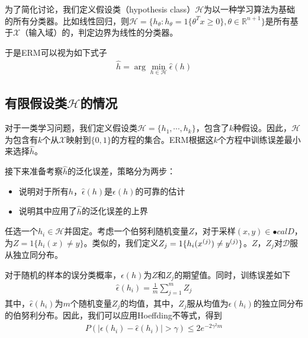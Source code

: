 为了简化讨论，我们定义假设类（hypothesis class）$\mathcal{H}$为以一种学习算法为基础的所有分类器。比如线性回归，则$\mathcal{H}=\{h_\theta:h_\theta=1\{\theta^Tx\geq 0\},\theta\in \mathbb{R}^{n+1}\}$是所有基于$\mathcal{X}$（输入域）的，判定边界为线性的分类器。

于是ERM可以视为如下式子
\begin{eqnarray}
\hat{h}=\arg\min_{h\in\mathcal{H}}\hat{\epsilon}(h)
\end{eqnarray}

\subsection{有限假设类$\mathcal{H}$的情况}
对于一类学习问题，我们定义假设类$\mathcal{H}=\{h_1,\cdots,h_k\}$，包含了$k$种假设。因此，$\mathcal{H}$为包含有$k$个从$\mathcal{X}$映射到$\{0,1\}$的方程的集合。ERM根据这$k$个方程中训练误差最小来选择$\hat{h}$。

接下来准备考察$\hat{h}$的泛化误差，策略分为两步：
\begin{itemize}
\item 说明对于所有$h$，$\hat{\epsilon}(h)$是$\epsilon(h)$的可靠的估计
\item 说明其中应用了$\hat{h}$的泛化误差的上界
\end{itemize}

任选一个$h_i\in \mathcal{H}$并固定。考虑一个伯努利随机变量$Z$，对于采样$(x,y)\in \mathcal{•}cal{D}$，为$Z=1\{h_i(x)\neq y\}$。类似的，我们定义$Z_j=1\{h_i({x}^{({j})})\neq{y}^{({j})}\}$。$Z$，$Z_j$对$\mathcal{D}$服从独立同分布。

对于随机的样本的误分类概率，$\epsilon(h)$为$Z$和$Z_j$的期望值。同时，训练误差如下
\begin{eqnarray}
\hat{\epsilon}(h_i)=\frac{1}{m}\sum_{j=1}^mZ_j
\end{eqnarray}
其中，$\hat{\epsilon}(h_i)$为$m$个随机变量$Z_j$的均值，其中，$Z_j$服从均值为$\epsilon(h_i)$的独立同分布的伯努利分布。因此，我们可以应用Hoeffding不等式，得到
\begin{eqnarray}
P(|\epsilon(h_i)-\hat{\epsilon}(h_i)|>\gamma)\leq 2e^{-2\gamma^2m}
\end{eqnarray}

